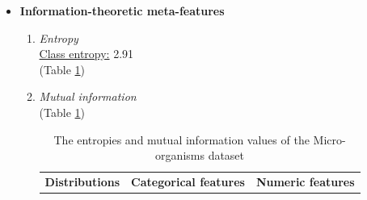 \documentclass[10pt,a4paper]{report}
\begin{document}
\begin{itemize}
\begin{enumerate}
			\underline{Explained variation component 1:} 0.14 \\
			\underline{Explained variation component 2:} 0.10 \\
			\underline{Explained variation component 3:} 0.08 \\
			\underline{Eigenvalue component 1:} 112301000896299.64 \\
			\underline{Eigenvalue component 2:} 83271983089506.69 \\
			\underline{Eigenvalue component 3:} 63192806579339.62 \\
			\underline{Determinant value:} $\infty$ \\
		\end{enumerate}
		\item \textbf{Information-theoretic meta-features} \\ 
		\begin{enumerate}
			\item \textit{Entropy} \\
			\underline{Class entropy:} 2.91 \\
			(Table \ref{tab:EntropyMIMODataset})
			\item \textit{Mutual information} \\
			(Table \ref{tab:EntropyMIMODataset})
			\begin{table}[h!]
				\caption{The entropies and mutual information values of the Micro-organisms dataset}
				\label{tab:EntropyMIMODataset}
				\begin{tabular}{l|llllll}
					\multirow{2}{*}{\textbf{Distributions}} & \multicolumn{3}{l}{\textbf{Categorical features}}                                                                                                                                                                                    & \multicolumn{3}{l}{\textbf{Numeric features}}                                                                                                                                                                   \\ \cline{2-7} 

\end{tabular}
\end{table}
\end{enumerate}
\end{itemize}
\end{document}
